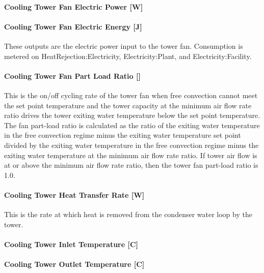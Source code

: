 \paragraph{Cooling Tower Fan Electric Power {[}W{]}}\label{cooling-tower-fan-electric-power-w-3}

\paragraph{Cooling Tower Fan Electric Energy {[}J{]}}\label{cooling-tower-fan-electric-energy-j-3}

These outputs are the electric power input to the tower fan. Consumption is metered on HeatRejection:Electricity, Electricity:Plant, and Electricity:Facility.

\paragraph{Cooling Tower Fan Part Load Ratio {[]}}\label{cooling-tower-fan-part-load-ratio}

This is the on/off cycling rate of the tower fan when free convection cannot meet the set point temperature and the tower capacity at the minimum air flow rate ratio drives the tower exiting water temperature below the set point temperature. The fan part-load ratio is calculated as the ratio of the exiting water temperature in the free convection regime minus the exiting water temperature set point divided by the exiting water temperature in the free convection regime minus the exiting water temperature at the minimum air flow rate ratio. If tower air flow is at or above the minimum air flow rate ratio, then the tower fan part-load ratio is 1.0.

\paragraph{Cooling Tower Heat Transfer Rate {[}W{]}}\label{cooling-tower-heat-transfer-rate-w-3}

This is the rate at which heat is removed from the condenser water loop by the tower.

\paragraph{Cooling Tower Inlet Temperature {[}C{]}}\label{cooling-tower-inlet-temperature-c-3}

\paragraph{Cooling Tower Outlet Temperature {[}C{]}}\label{cooling-tower-outlet-temperature-c-3}

